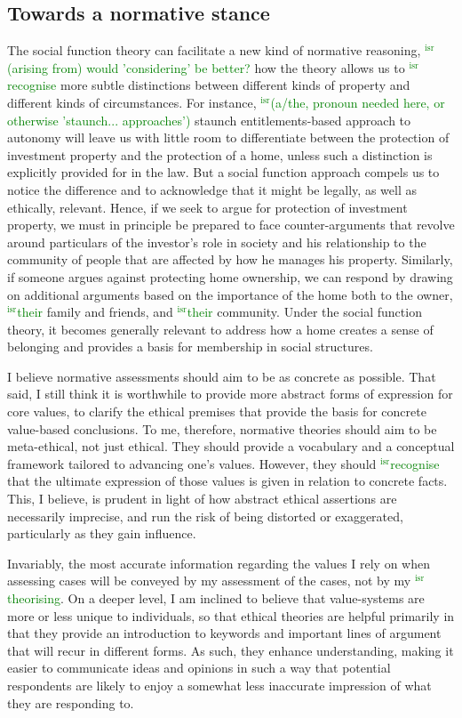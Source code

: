 \documentclass[12pt,a4paper]{book} %
\newcommand{\isr}[1]{\textcolor{green}{$^{\textrm{isr}}${#1}}}
\begin{document}
\subsection{Towards a normative stance}

The social function theory can facilitate a new kind of normative reasoning, \isr{(arising from) would 'considering' be better?}  how the theory allows us to \isr{recognise} more subtle distinctions between different kinds of property and different kinds of circumstances. For instance, \isr{(a/the, pronoun needed here, or otherwise 'staunch... approaches')} staunch entitlements-based approach to autonomy will leave us with little room to differentiate between the protection of investment property and the protection of a home, unless such a distinction is explicitly provided for in the law. But a social function approach compels us to notice the difference and to acknowledge that it might be legally, as well as ethically, relevant. Hence, if we seek to argue for protection of investment property, we must in principle be prepared to face counter-arguments that revolve around particulars of the investor's role in society and his relationship to the community of people that are affected by how he manages his property. Similarly, if someone argues against protecting home ownership, we can respond by drawing on additional arguments based on the importance of the home both to the owner, \isr{their} family and friends, and \isr{their} community. Under the social function theory, it becomes generally relevant to address how a home creates a sense of belonging and provides a basis for membership in social structures.

I believe normative assessments should aim to be as concrete as possible. That said, I still think it is worthwhile to provide more abstract forms of expression for core values, to clarify the ethical premises that provide the basis for concrete value-based conclusions. To me, therefore, normative theories should aim to be meta-ethical, not just ethical. They should provide a vocabulary and a conceptual framework tailored to advancing one's values. However, they should \isr{recognise} that the ultimate expression of those values is given in relation to concrete facts. This, I believe, is prudent in light of how abstract ethical assertions are necessarily imprecise, and run the risk of being distorted or exaggerated, particularly as they gain influence.

Invariably, the most accurate information regarding the values I rely on when assessing cases will be conveyed by my assessment of the cases, not by my \isr{theorising}. On a deeper level, I am inclined to believe that value-systems are more or less unique to individuals, so that ethical theories are helpful primarily in that they provide an introduction to keywords and important lines of argument that will recur in different forms. As such, they enhance understanding, making it easier to communicate ideas and opinions in such a way that potential respondents are likely to enjoy a somewhat less inaccurate impression of what they are responding to. 
\end{document}
